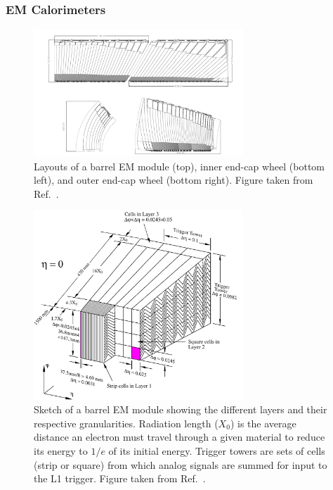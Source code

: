 {\subsubsection{EM Calorimeters}
\begin{figure}[ht]
	\centerline{
		\includegraphics[width=0.7\textwidth]{figures/emmodules.pdf} 
	}
	\caption{Layouts of a barrel EM module (top), inner end-cap wheel (bottom left), and outer end-cap wheel (bottom right). Figure taken from Ref.~\cite{Aad:2008zzm}.  }
	\label{fig:emmodules}
\end{figure}

\begin{figure}[ht]
	\centerline{
		\includegraphics[width=0.7\textwidth]{figures/barrel_module.pdf} 
	}
	\caption{Sketch of a barrel EM module showing the different layers and their respective granularities. Radiation length ($X_{0}$) is the average distance an electron must travel through a given material to reduce its energy to $1/e$ of its initial energy. Trigger towers are sets of cells (strip or square) from which analog signals are summed for input to the L1 trigger. Figure taken from Ref.~\cite{Aad:2008zzm}.  }
	\label{fig:barrelemmodule}
\end{figure}

}
